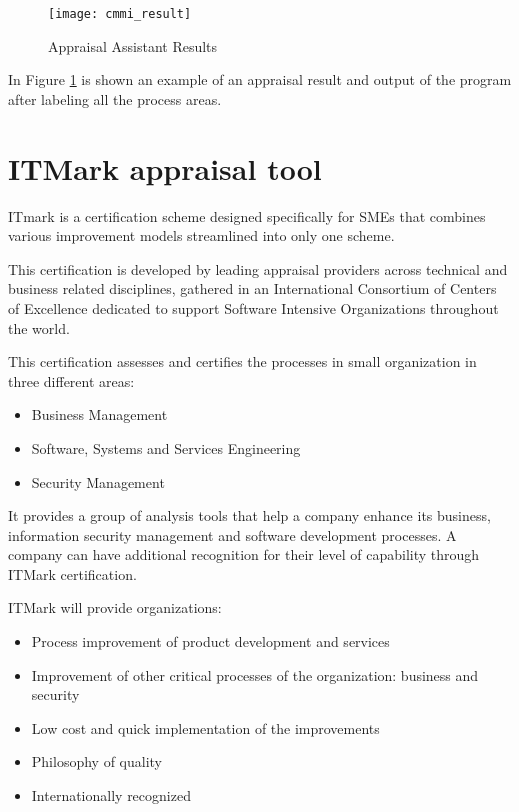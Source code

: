 \begin{figure}[h]
	\begin{center}
		\leavevmode
		\texttt{[image: cmmi\_result]}
		\caption{Appraisal Assistant Results}
		\label{fig:cmmi_result}
	\end{center}
\end{figure}

In Figure \ref{fig:cmmi_result} is shown an example of an appraisal result and output of the program after labeling all the process areas.
\newpage


\section{ITMark appraisal tool}

ITmark \citep{ITMARK} is a certification scheme designed specifically for SMEs that combines various improvement models streamlined into only one scheme.

This certification is developed by leading appraisal providers across technical and business related disciplines, gathered in an International Consortium of Centers of Excellence dedicated to support Software Intensive Organizations throughout the world.

This certification assesses and certifies the processes in small organization in three different areas:
\begin{itemize}
	\item Business Management
	\item Software, Systems and Services Engineering
	\item Security Management
\end{itemize}

It provides a group of analysis tools that help a company enhance its business, information security management and software development processes. A company can have additional recognition for their level of capability through ITMark certification.

ITMark will provide organizations:
\begin{itemize}
	\item Process improvement of product development and services
	\item Improvement of other critical processes of the organization: business and security
	\item Low cost and quick implementation of the improvements
	\item Philosophy of quality
	\item Internationally recognized
\end{itemize}

